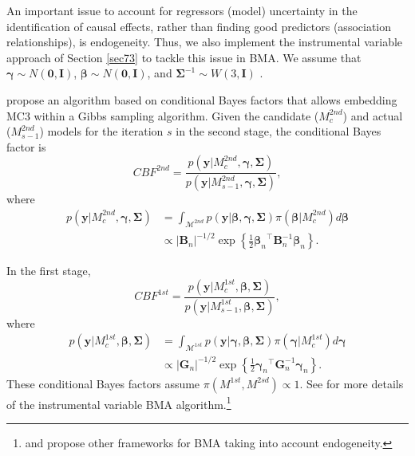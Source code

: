 An important issue to account for regressors (model) uncertainty in the identification of causal effects, rather than finding good predictors (association relationships), is endogeneity. Thus, we also implement the instrumental variable approach of Section \ref{sec73} to tackle this issue in BMA. We assume that $\bm{\gamma}\sim {N}(\bm{0},\bm{I})$, $\bm{\beta}\sim {N}(\bm{0},\bm{I})$, and $\bm{\Sigma}^{-1} \sim {W}(3,\bm{I})$ \cite{Karl2012}.

\cite{Lenkoski2013} propose an algorithm based on conditional Bayes factors \cite{Dickey1978} that allows embedding MC3 within a Gibbs sampling algorithm. Given the candidate ($M_{c}^{2nd}$) and actual ($M_{s-1}^{2nd}$) models for the iteration $s$ in the second stage, the conditional Bayes factor is 
\begin{equation*}
	CBF^{2nd}=\frac{p(\bm{y}|M_{c}^{2nd},\bm{\gamma},\bm{\Sigma})}{p(\bm{y}|M_{s-1}^{2nd},\bm{\gamma},\bm{\Sigma})},
\end{equation*}
where 
\begin{align*}
	p(\bm{y}|M_{c}^{2nd},\bm{\gamma},\bm{\Sigma})&=\int_{\mathcal{M}^{2nd}}p(\bm{y}|\bm{\beta},\bm{\gamma},\bm{\Sigma})\pi(\bm{\beta}|M_{c}^{2nd})d\bm{\beta}\\
	&\propto |\bm{B}_n|^{-1/2} \exp\left\{\frac{1}{2}{\bm{\beta}_n}^{\top}\bm{B}_n^{-1}\bm{\beta}_n\right\}
	.
\end{align*}

In the first stage,
\begin{equation*}
	CBF^{1st}=\frac{p(\bm{y}|M_{c}^{1st},\bm{\beta},\bm{\Sigma})}{p(\bm{y}|M_{s-1}^{1st},\bm{\beta},\bm{\Sigma})},
\end{equation*}
where \begin{align*}
	p(\bm{y}|M_{c}^{1st},\bm{\beta},\bm{\Sigma})&=\int_{\mathcal{M}^{1st}}p(\bm{y}|\bm{\gamma},\bm{\beta},\bm{\Sigma})\pi(\bm{\gamma}|M_{c}^{1st})d\bm{\gamma}\\
	&\propto |\bm{G}_n|^{-1/2} \exp\left\{\frac{1}{2}{\bm{\gamma}_n}^{\top}\bm{G}_n^{-1}\bm{\gamma}_n\right\}.
\end{align*}
These conditional Bayes factors assume $\pi(M^{1st},M^{2sd})\propto 1$. See \cite{Lenkoski2013} for more details of the instrumental variable BMA algorithm.\footnote{\cite{Koop12} and \cite{Lenkoski2014} propose other frameworks for BMA taking into account endogeneity.}

